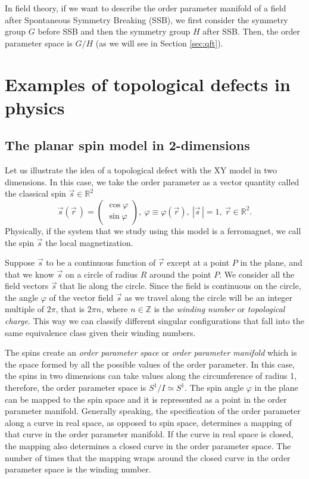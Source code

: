 In field theory, if we want to describe the order parameter manifold of a field after Spontaneous Symmetry Breaking (SSB), we first consider the symmetry group $G$ before SSB and then the symmetry group $H$ after SSB. Then, the order parameter space is $G/H$ (as we will see in Section \ref{sec:qft}). 

\section{Examples of topological defects in physics}\label{sec:examples}

\subsection{The planar spin model in 2-dimensions}\label{sec:XY}
Let us illustrate the idea of a topological defect with the XY model in two dimensions. In this case, we take the order parameter as a vector quantity called the classical spin $\vec{s}\in \mathbb{R}^2$
\begin{equation}
	\vec{s}(\vec{r}\,) = \begin{pmatrix}
	\cos\varphi \\
	\sin\varphi
\end{pmatrix},\ \varphi \equiv \varphi(\vec{r}),\ |\vec{s}\,| = 1, \  \vec{r}\in\mathbb{R}^2.
\end{equation}
Physically, if the system that we study using this model is a ferromagnet, we call the spin $\vec{s}$ the local magnetization.

Suppose $\vec{s}$ to be a continuous function of $\vec{r}$ except at a point $P$ in the plane, and that we know $\vec{s}$ on a circle of radius $R$ around the point $P$. We consider all the field vectors $\vec{s}$ that lie along the circle.  Since the field is continuous on the circle, the angle $\varphi$ of the vector field $\vec{s}$ as we travel along the circle will be an integer multiple of $2\pi$, that is $2\pi n$, where $n\in\mathbb{Z}$ is the \textit{winding number} or \textit{topological charge}. This way we can classify different singular configurations that fall into the same equivalence class given their winding numbers.

The spins create an \textit{order parameter space} or \textit{order parameter manifold} which is the space formed by all the possible values of the order parameter. In this case, the spins in two dimensions can take values along the circumference of radius 1, therefore, the order parameter space is $S^1/I \simeq S^1$. The spin angle $\varphi$ in the plane can be mapped to the spin space and it is represented as a point in the order parameter manifold. Generally speaking, the specification of the order parameter along a curve in real space, as opposed to spin space, determines a mapping of that curve in the order parameter manifold. If the curve in real space is closed, the mapping also determines a closed curve in the order parameter space. The number of times that the mapping wraps around the closed curve in the order parameter space is the winding number.  

